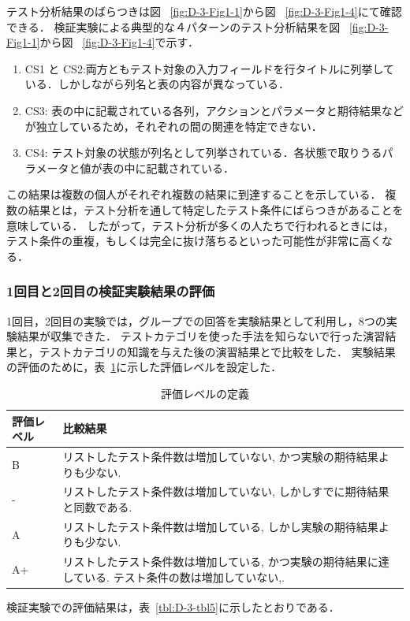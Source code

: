 \documentclass[10pt,a4j]{jarticle}
\begin{document}
テスト分析結果のばらつきは図 ~\ref{fig:D-3-Fig1-1}から図 ~\ref{fig:D-3-Fig1-4}にて確認できる．
検証実験による典型的な４パターンのテスト分析結果を図 ~\ref{fig:D-3-Fig1-1}から図 ~\ref{fig:D-3-Fig1-4}で示す．

\begin{enumerate}
\item CS1 と CS2:両方ともテスト対象の入力フィールドを行タイトルに列挙している．しかしながら列名と表の内容が異なっている．
\item CS3: 表の中に記載されている各列，アクションとパラメータと期待結果などが独立しているため，それぞれの間の関連を特定できない．
\item CS4: テスト対象の状態が列名として列挙されている．各状態で取りうるパラメータと値が表の中に記載されている．
\end{enumerate}

この結果は複数の個人がそれぞれ複数の結果に到達することを示している．
複数の結果とは，テスト分析を通して特定したテスト条件にばらつきがあることを意味している．
したがって，テスト分析が多くの人たちで行われるときには，テスト条件の重複，もしくは完全に抜け落ちるといった可能性が非常に高くなる．

\subsubsection{1回目と2回目の検証実験結果の評価}
1回目，2回目の実験では，グループでの回答を実験結果として利用し，8つの実験結果が収集できた．
テストカテゴリを使った手法を知らないで行った演習結果と，テストカテゴリの知識を与えた後の演習結果とで比較をした．
実験結果の評価のために，表~\ref{tbl:D-3-tbl4}に示した評価レベルを設定した．
\begin{table}[htbp]
\footnotesize
  \centering
  \caption{評価レベルの定義}
    \begin{tabular}{|l|p{14em}|}
       \hline
    評価レベル & \multicolumn{1}{l|}{比較結果} \\
        \hline
     B    & リストしたテスト条件数は増加していない, かつ実験の期待結果よりも少ない.  \\
        \hline
    -     & リストしたテスト条件数は増加していない, しかしすでに期待結果と同数である.  \\
        \hline
    A     & リストしたテスト条件数は増加している, しかし実験の期待結果よりも少ない.   \\
       \hline
    A+    & リストしたテスト条件数は増加している, かつ実験の期待結果に達している. テスト条件の数は増加していない,.  \\
        \hline
    \end{tabular}%
  \label{tbl:D-3-tbl4}%
\end{table}%
検証実験での評価結果は，表~\ref{tbl:D-3-tbl5}に示したとおりである．
\end{document}

